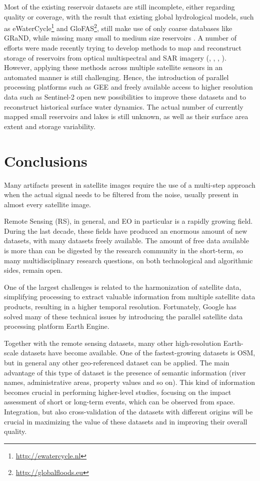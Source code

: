 Most of the existing reservoir datasets are still incomplete, either regarding quality or coverage, with the result that existing global hydrological models, such as eWaterCycle\footnote{\url{http://ewatercycle.nl}} and GloFAS\footnote{\url{http://globalfloods.eu}}, still make use of only coarse databases like GRaND, while missing many small to medium size reservoirs \cite{emerton2016continental}. A number of efforts were made recently trying to develop methods to map and reconstruct storage of reservoirs from optical multispectral and \gls{SAR} imagery (\citet{duan2013estimating}, \citet{Eilander2014}, \citet{amitrano2014sentinel}, \citet{khandelwal2017approach}). However, applying these methods across multiple satellite sensors in an automated manner is still challenging. Hence, the introduction of parallel processing platforms such as GEE and freely available access to higher resolution data such as Sentinel-2 open new possibilities to improve these datasets and to reconstruct historical surface water dynamics. The actual number of currently mapped small reservoirs and lakes is still unknown, as well as their surface area extent and storage variability. 

\section{Conclusions}

Many artifacts present in satellite images require the use of a multi-step approach when the actual signal needs to be filtered from the noise, usually present in almost every satellite image.

Remote Sensing (RS), in general, and \gls{EO} in particular is a rapidly growing field. During the last decade, these fields have produced an enormous amount of new datasets, with many datasets freely available. The amount of free data available is more than can be digested by the research community in the short-term, so many multidisciplinary research questions, on both technological and algorithmic sides, remain open.

One of the largest challenges is related to the harmonization of satellite data, simplifying processing to extract valuable information from multiple satellite data products, resulting in a higher temporal resolution. Fortunately, Google has solved many of these technical issues by introducing the parallel satellite data processing platform Earth Engine. 

Together with the remote sensing datasets, many other high-resolution Earth-scale datasets have become available. One of the fastest-growing datasets is \gls{OSM}, but in general any other geo-referenced dataset can be applied. The main advantage of this type of dataset is the presence of semantic information (river names, administrative areas, property values and so on). This kind of information becomes crucial in performing higher-level studies, focusing on the impact assessment of short or long-term events, which can be observed from space. Integration, but also cross-validation of the datasets with different origins will be crucial in maximizing the value of these datasets and in improving their overall quality.

